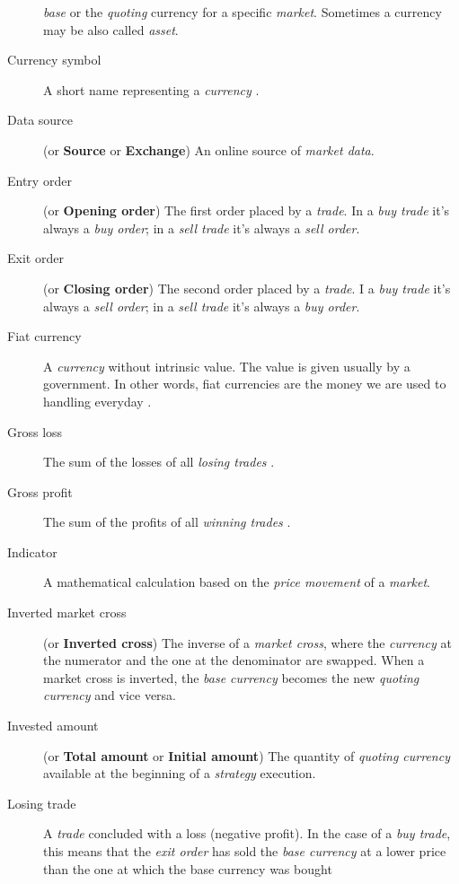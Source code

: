 \begin{description}
		\textit{base} or the \textit{quoting} currency for a specific
		\textit{market}. Sometimes a currency may be also called
		\textit{asset}.
	\item[Currency symbol] A short name representing a \textit{currency}
		.
	\item[Data source] (or \textbf{Source} or \textbf{Exchange}) An online
		source of \textit{market data}.
	\item[Entry order] (or \textbf{Opening order}) The first order placed by
		a \textit{trade}. In a \textit{buy trade} it's always a
		\textit{buy order}; in a \textit{sell trade} it's always a
		\textit{sell order}.
	\item[Exit order] (or \textbf{Closing order}) The second order placed by
		a \textit{trade}. I a \textit{buy trade} it's always a
		\textit{sell order}; in a \textit{sell trade} it's always a
		\textit{buy order}.
	\item[Fiat currency] A \textit{currency} without intrinsic value. The
		value is given usually by a government. In other words, fiat
		currencies are the money we are used to handling everyday
		.
	\item[Gross loss] The sum of the losses of all \textit{losing trades}
		.
	\item[Gross profit] The sum of the profits of all \textit{winning
		trades} .
	\item[Indicator] A mathematical calculation based on the \textit{price
		movement} of a \textit{market}.
	\item[Inverted market cross] (or \textbf{Inverted cross}) The inverse of
		a \textit{market cross}, where the \textit{currency} at the
		numerator and the one at the denominator are swapped. When a
		market cross is inverted, the \textit{base currency} becomes the
		new \textit{quoting currency} and vice versa.
	\item[Invested amount] (or \textbf{Total amount} or \textbf{Initial
		amount}) The quantity of \textit{quoting currency} available at
		the beginning of a \textit{strategy} execution.
	\item[Losing trade] A \textit{trade} concluded with a loss (negative
		profit). In the case of a \textit{buy trade}, this means that
		the \textit{exit order} has sold the \textit{base currency} at a
		lower price than the one at which the base currency was bought

\end{description}
